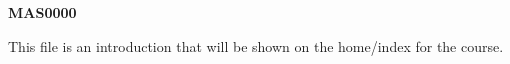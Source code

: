 \documentclass{article}
\begin{document}
{\Large \bf MAS0000}

This file is an introduction that will be shown on the home/index for the course.
\end{document}
